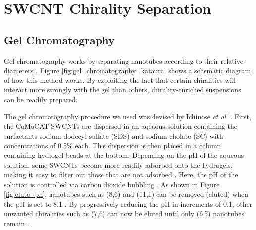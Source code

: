 \section{SWCNT Chirality Separation}

\subsection{Gel Chromatography}
Gel chromatography works by separating nanotubes according to their relative diameters \cite{liu2011large}. Figure \ref{fig:gel_chromatography_kataura} shows a schematic diagram of how this method works. By exploiting the fact that certain chiralities will interact more strongly with the gel than others, chirality-enriched suspensions can be readily prepared.

The gel chromatography procedure we used was devised by Ichinose \textit{et al}. \cite{ichinose2017extraction}. First, the CoMoCAT SWCNTs are dispersed in an aqeuous solution containing the surfactants sodium dodecyl sulfate (SDS) and sodium cholate (SC) with concentrations of 0.5\% each. This dispersion is then placed in a column containing hydrogel beads at the bottom. Depending on the pH of the aqueous solution, some SWCNTs become more readily adsorbed onto the hydrogels, making it easy to filter out those that are not adsorbed \cite{liu2011large}. Here, the pH of the solution is controlled via carbon dioxide bubbling \cite{ichinose2017extraction}. As shown in Figure \ref{fig:elute_ph}, nanotubes such as (8,6) and (11,1) can be removed (eluted) when the pH is set to 8.1 \cite{ichinose2017extraction}. By progressively reducing the pH in increments of 0.1, other unwanted chiralities such as (7,6) can now be eluted until only (6,5) nanotubes remain \cite{ichinose2017extraction}.

